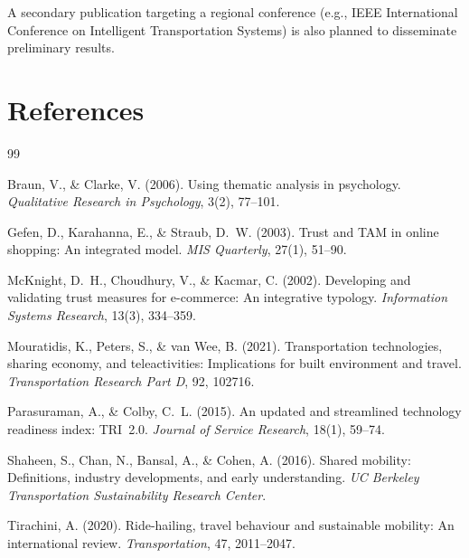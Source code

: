 \documentclass[12pt,a4paper]{article}
\begin{document}
A secondary publication targeting a regional conference (e.g., IEEE International Conference on Intelligent Transportation Systems) is also planned to disseminate preliminary results.

\section*{References}

\begin{thebibliography}{99}

Braun, V., \& Clarke, V. (2006).
\newblock Using thematic analysis in psychology.
\newblock \textit{Qualitative Research in Psychology}, 3(2), 77--101.

Gefen, D., Karahanna, E., \& Straub, D.~W. (2003).
\newblock Trust and TAM in online shopping: An integrated model.
\newblock \textit{MIS Quarterly}, 27(1), 51--90.

McKnight, D.~H., Choudhury, V., \& Kacmar, C. (2002).
\newblock Developing and validating trust measures for e-commerce: An integrative typology.
\newblock \textit{Information Systems Research}, 13(3), 334--359.

Mouratidis, K., Peters, S., \& van Wee, B. (2021).
\newblock Transportation technologies, sharing economy, and teleactivities: Implications for built environment and travel.
\newblock \textit{Transportation Research Part D}, 92, 102716.

Parasuraman, A., \& Colby, C.~L. (2015).
\newblock An updated and streamlined technology readiness index: TRI~2.0.
\newblock \textit{Journal of Service Research}, 18(1), 59--74.

Shaheen, S., Chan, N., Bansal, A., \& Cohen, A. (2016).
\newblock Shared mobility: Definitions, industry developments, and early understanding.
\newblock \textit{UC Berkeley Transportation Sustainability Research Center}.

Tirachini, A. (2020).
\newblock Ride-hailing, travel behaviour and sustainable mobility: An international review.
\newblock \textit{Transportation}, 47, 2011--2047.

\end{thebibliography}
\end{document}
